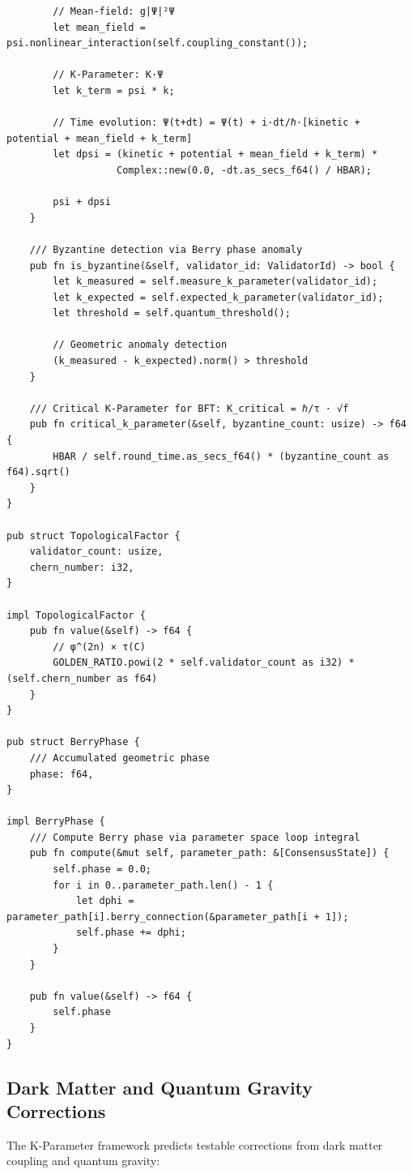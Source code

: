 \documentclass[11pt,a4paper]{article}
\begin{document}
\begin{lstlisting}
        // Mean-field: g|Ψ|²Ψ
        let mean_field = psi.nonlinear_interaction(self.coupling_constant());

        // K-Parameter: K·Ψ
        let k_term = psi * k;

        // Time evolution: Ψ(t+dt) = Ψ(t) + i·dt/ℏ·[kinetic + potential + mean_field + k_term]
        let dpsi = (kinetic + potential + mean_field + k_term) *
                   Complex::new(0.0, -dt.as_secs_f64() / HBAR);

        psi + dpsi
    }

    /// Byzantine detection via Berry phase anomaly
    pub fn is_byzantine(&self, validator_id: ValidatorId) -> bool {
        let k_measured = self.measure_k_parameter(validator_id);
        let k_expected = self.expected_k_parameter(validator_id);
        let threshold = self.quantum_threshold();

        // Geometric anomaly detection
        (k_measured - k_expected).norm() > threshold
    }

    /// Critical K-Parameter for BFT: K_critical = ℏ/τ · √f
    pub fn critical_k_parameter(&self, byzantine_count: usize) -> f64 {
        HBAR / self.round_time.as_secs_f64() * (byzantine_count as f64).sqrt()
    }
}

pub struct TopologicalFactor {
    validator_count: usize,
    chern_number: i32,
}

impl TopologicalFactor {
    pub fn value(&self) -> f64 {
        // φ^(2n) × τ(C)
        GOLDEN_RATIO.powi(2 * self.validator_count as i32) * (self.chern_number as f64)
    }
}

pub struct BerryPhase {
    /// Accumulated geometric phase
    phase: f64,
}

impl BerryPhase {
    /// Compute Berry phase via parameter space loop integral
    pub fn compute(&mut self, parameter_path: &[ConsensusState]) {
        self.phase = 0.0;
        for i in 0..parameter_path.len() - 1 {
            let dphi = parameter_path[i].berry_connection(&parameter_path[i + 1]);
            self.phase += dphi;
        }
    }

    pub fn value(&self) -> f64 {
        self.phase
    }
}
\end{lstlisting}

\subsection{Dark Matter and Quantum Gravity Corrections}

The K-Parameter framework predicts testable corrections from dark matter coupling and quantum gravity:
\end{document}
